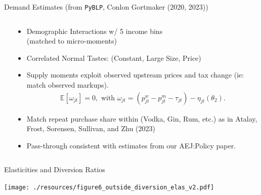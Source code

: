 \begin{frame}{Demand Estimates (from \texttt{PyBLP}, Conlon Gortmaker (2020, 2023))}
\begin{columns}[T]
 \hspace{-1.5cm}
 \begin{column}{.68\textwidth}
\vspace{-0.3cm}
    \begin{center}
    \scalebox{0.55}{
    
    }
    \end{center}
  \end{column}
  \hfill
 \hspace{-2.2cm}
\begin{column}{.55\textwidth}
  \begin{itemize}
    \item Demographic Interactions w/ 5 income bins \\ (matched to micro-moments)
    \item Correlated Normal Tastes: (Constant, Large Size, Price)
    \item Supply moments exploit observed upstream prices and tax change (ie: match observed markups).
    \vspace{-0.2cm}
    \begin{align*}
    \mathbb{E}[\omega_{jt}]=0, \text{ with }\omega_{jt} = \left(p^w_{jt}  - p^m_{jt}-\tau_{jt} \right) -\eta_{jt}\left(\theta_2\right).
    \end{align*}
   \vspace{-0.8cm}
    \item Match repeat purchase share within (Vodka, Gin, Rum, etc.) as in Atalay, Frost, Sorensen, Sullivan, and Zhu (2023)
    \item Pass-through consistent with estimates from our AEJ:Policy paper.
  \end{itemize}
\end{column}
\end{columns}
\end{frame}

\begin{frame}{Elasticities and Diversion Ratios}
\begin{center}
    \texttt{[image: ./resources/figure6\_outside\_diversion\_elas\_v2.pdf]}
\end{center}
\end{frame}



